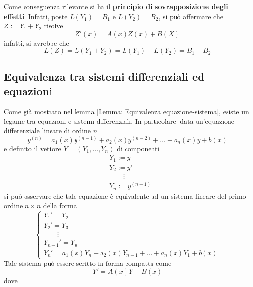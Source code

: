 \begin{oss}    
Come conseguenza rilevante si ha il \textbf{principio di sovrapposizione degli effetti}. Infatti, poste $L(Y_1)=B_1$ e $L(Y_2)=B_2$, si può affermare che
$Z:=Y_1+Y_2$ risolve 
\begin{equation}
    Z'(x)=A(x)Z(x)+B(X)
\end{equation}
infatti, si avrebbe che
\begin{equation}
L(Z)=L(Y_1+Y_2)=L(Y_1)+L(Y_2)=B_1+B_2
\end{equation}
\end{oss}
\subsection{Equivalenza tra sistemi differenziali ed equazioni}
Come già mostrato nel lemma \ref{Lemma: Equivalenza equazione-sistema}, esiste un legame tra equazioni e sistemi differenziali. In particolare, data un'equazione differenziale lineare di ordine $n$
\begin{equation}
    y^{(n)}=a_1(x)y^{(n-1)}+a_2(x)y^{(n-2)}+ \dots+a_n(x)y+b(x)
\end{equation}
e definito il vettore $Y=(Y_1, \dots, Y_n)$ di componenti
\begin{equation}
\begin{aligned}
&Y_1:=y\\
&Y_2:=y'\\
&\qquad \vdots\\
&Y_n:=y^{(n-1)}
\end{aligned}
\end{equation}
si può osservare che tale equazione è equivalente ad un sistema lineare del primo ordine $n\times n$ della forma
\begin{equation}
    \begin{cases}
        Y_1'=Y_2\\
        Y_2'=Y_3\\
        \qquad\vdots\\
        Y_{n-1}'=Y_n\\
        Y_n'= a_1(x) Y_n+ a_2(x) Y_{n-1}+ \dots+ a_n(x) Y_1 + b(x)
    \end{cases}
\end{equation}
Tale sistema può essere scritto in forma compatta come \begin{equation}
Y'=A(x)Y+B(x)
\end{equation}
dove
